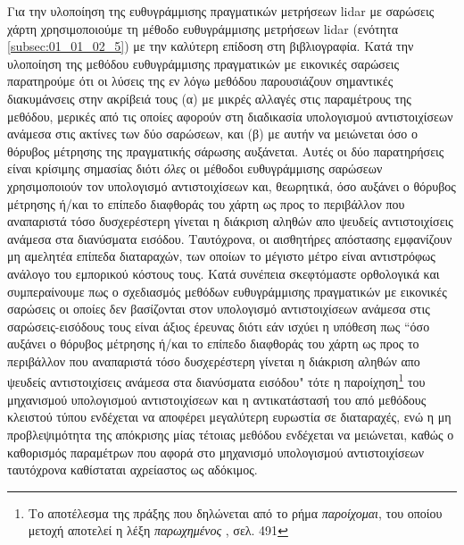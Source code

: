 Για την υλοποίηση της ευθυγράμμισης πραγματικών μετρήσεων lidar με σαρώσεις
χάρτη χρησιμοποιούμε τη μέθοδο ευθυγράμμισης μετρήσεων lidar (ενότητα
\ref{subsec:01_01_02_5}) με την καλύτερη επίδοση στη βιβλιογραφία. Κατά την
υλοποίηση της μεθόδου ευθυγράμμισης πραγματικών με εικονικές σαρώσεις
παρατηρούμε ότι οι λύσεις της εν λόγω μεθόδου παρουσιάζουν σημαντικές
διακυμάνσεις στην ακρίβειά τους (α) με μικρές αλλαγές στις παραμέτρους της
μεθόδου, μερικές από τις οποίες αφορούν στη διαδικασία υπολογισμού
αντιστοιχίσεων ανάμεσα στις ακτίνες των δύο σαρώσεων, και (β) με αυτήν να
μειώνεται όσο ο θόρυβος μέτρησης της πραγματικής σάρωσης αυξάνεται. Αυτές οι
δύο παρατηρήσεις είναι κρίσιμης σημασίας διότι \textit{όλες} οι μέθοδοι
ευθυγράμμισης σαρώσεων χρησιμοποιούν τον υπολογισμό αντιστοιχίσεων και,
θεωρητικά, όσο αυξάνει ο θόρυβος μέτρησης ή/και το επίπεδο διαφθοράς του χάρτη
ως προς το περιβάλλον που αναπαριστά τόσο δυσχερέστερη γίνεται η διάκριση
αληθών απο ψευδείς αντιστοιχίσεις ανάμεσα στα διανύσματα εισόδου. Ταυτόχρονα,
οι αισθητήρες απόστασης εμφανίζουν μη αμελητέα επίπεδα διαταραχών, των οποίων
το μέγιστο μέτρο είναι αντιστρόφως ανάλογο του εμπορικού κόστους τους. Κατά
συνέπεια σκεφτόμαστε ορθολογικά και συμπεραίνουμε πως ο σχεδιασμός μεθόδων
ευθυγράμμισης πραγματικών με εικονικές σαρώσεις οι οποίες δεν βασίζονται στον
υπολογισμό αντιστοιχίσεων ανάμεσα στις σαρώσεις-εισόδους τους είναι άξιος
έρευνας διότι εάν ισχύει η υπόθεση πως ``όσο αυξάνει ο θόρυβος μέτρησης ή/και
το επίπεδο διαφθοράς του χάρτη ως προς το περιβάλλον που αναπαριστά τόσο
δυσχερέστερη γίνεται η διάκριση αληθών απο ψευδείς αντιστοιχίσεις ανάμεσα στα
διανύσματα εισόδου" τότε η παροίχηση\footnote{Το αποτέλεσμα της πράξης που
δηλώνεται από το ρήμα \textit{παροίχομαι}, του οποίου μετοχή αποτελεί η λέξη
\textit{παρωχημένος} \cite{liddell_scott}, σελ. 491} του μηχανισμού υπολογισμού
αντιστοιχίσεων και η αντικατάστασή του από μεθόδους κλειστού τύπου ενδέχεται να
αποφέρει μεγαλύτερη ευρωστία σε διαταραχές, ενώ η μη προβλεψιμότητα της
απόκρισης μίας τέτοιας μεθόδου ενδέχεται να μειώνεται, καθώς ο καθορισμός
παραμέτρων που αφορά στο μηχανισμό υπολογισμού αντιστοιχίσεων ταυτόχρονα
καθίσταται αχρείαστος ως αδόκιμος.\\


